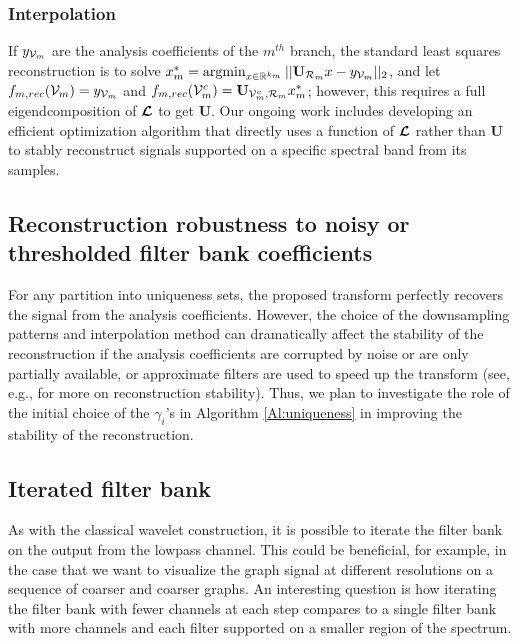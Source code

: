 \documentclass{article}
\begin{document}
\subsubsection{Interpolation}
If $y_{{\mathcal{V}}_m}$ are the analysis coefficients of the $m^{th}$ branch, the standard least squares reconstruction is to solve $x_m^*=\operatorname*{argmin}_{x \in \mathbb{R}^{k_m}} ||\mathbf{U}_{{\cal R}_m}x - y_{{\mathcal{V}}_m} ||_2$, and let $f_{m,{rec}}({\mathcal{V}}_m)=y_{{\mathcal{V}}_m}$ and $f_{m,{rec}}({\mathcal{V}}_m^c)=\mathbf{U}_{{\mathcal{V}}_m^c,{\cal R}_m}x_m^*$; however, this requires a full eigendcomposition of $\boldsymbol{\mathcal{L}}$ to get $\mathbf{U}$. Our ongoing work includes developing an efficient optimization algorithm that directly uses a function of $\boldsymbol{\mathcal{L}}$ rather than $\mathbf{U}$ to stably reconstruct signals supported on a specific spectral band from its samples. 

\subsection{Reconstruction robustness to noisy or thresholded filter bank coefficients} \label{Se:noisy_ext}
For any partition into uniqueness sets, the proposed transform perfectly recovers the signal from the analysis coefficients. However, the choice of the downsampling patterns and interpolation method can dramatically affect the stability of the reconstruction if the analysis coefficients are corrupted by noise or are only partially available, or approximate filters are used to speed up the transform (see, e.g., \cite[Section III.B]{anis2016efficient} for more on reconstruction stability). Thus, we plan to investigate the role of the initial choice of the $\gamma_i$'s in Algorithm \ref{Al:uniqueness} in improving the stability of the reconstruction.

\subsection{Iterated filter bank} 
As with the classical wavelet construction, it is possible to iterate the filter bank on the output from the lowpass channel.
This could be beneficial, for example, in the case that we want to visualize the graph signal at different resolutions on  a sequence of coarser and coarser graphs. An interesting question is how iterating the filter bank with fewer channels at each step compares to a single filter bank with more channels and each filter supported on a smaller region of the spectrum.
\end{document}
